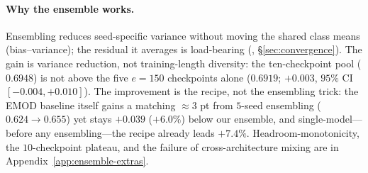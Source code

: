 \paragraph{Why the ensemble works.}
Ensembling reduces seed-specific variance without moving the shared
class means (bias--variance); the residual it averages is load-bearing
(, \S\ref{sec:convergence}). The gain is variance reduction, not training-length
diversity: the ten-checkpoint pool ($0.6948$) is not above the five
$e{=}150$ checkpoints alone ($0.6919$; $+0.003$, $95\%$ CI
$[-0.004,+0.010]$). The improvement is the recipe, not the ensembling
trick: the EMOD baseline itself gains a matching ${\approx}3$ pt from
$5$-seed ensembling ($0.624{\to}0.655$) yet stays $+0.039$ ($+6.0\%$)
below our ensemble, and single-model---before any ensembling---the recipe
already leads $+7.4\%$. 
Headroom-monotonicity, the $10$-checkpoint plateau, and the failure of
cross-architecture mixing are in Appendix~\ref{app:ensemble-extras}.
